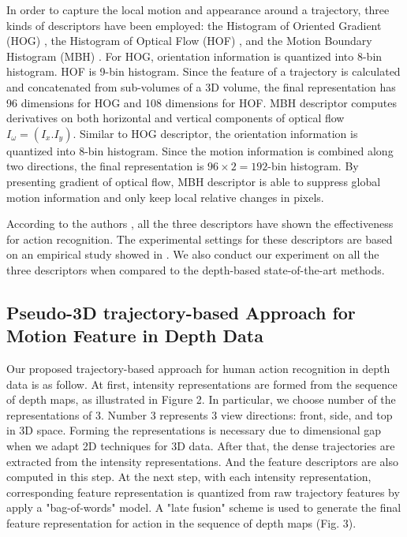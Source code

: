 \documentclass[review]{elsarticle}
\begin{document}
In order to capture the local motion and appearance around a trajectory, three kinds of descriptors have been employed: the Histogram of Oriented Gradient (HOG) \cite{dalal2005histograms}, the Histogram of Optical Flow (HOF) \cite{laptev2008learning}, and the Motion Boundary Histogram (MBH) \cite{dalal2006human}. For HOG, orientation information is quantized into 8-bin histogram. HOF is 9-bin histogram. Since the feature of a trajectory is calculated and concatenated from sub-volumes of a 3D volume, the final representation has 96 dimensions for HOG and 108 dimensions for HOF. MBH descriptor computes derivatives on both horizontal and vertical components of optical flow $I_\omega = (I_x. I_y)$. Similar to HOG descriptor, the orientation information is quantized into 8-bin histogram. Since the motion information is combined along two directions, the final representation is $96 \times 2 = 192$-bin histogram. By presenting gradient of optical flow, MBH descriptor is able to suppress global motion information and only keep local relative changes in pixels.

According to the authors \cite{laptev2008learning, wang2011densetraj, wang2009evaluation, liu2009recognizing}, all the three descriptors have shown the effectiveness for action recognition. The experimental settings for these descriptors are based on an empirical study showed in \cite{wang2011densetraj}. We also conduct our experiment on all the three descriptors when compared to the depth-based state-of-the-art methods.

\subsection{Pseudo-3D trajectory-based Approach for Motion Feature in Depth Data}

Our proposed trajectory-based approach for human action recognition in depth data is as follow. At first, intensity representations are formed from the sequence of depth maps, as illustrated in Figure 2. In particular, we choose number of the representations of 3. Number 3 represents 3 view directions: front, side, and top in 3D space. Forming the representations is necessary due to dimensional gap when we adapt 2D techniques for 3D data. After that, the dense trajectories are extracted from the intensity representations. And the feature descriptors are also computed in this step. At the next step, with each intensity representation, corresponding feature representation is quantized from raw trajectory features by apply a "bag-of-words" model. A "late fusion" scheme is used to generate the final feature representation for action in the sequence of depth maps (Fig. 3).
\end{document}
